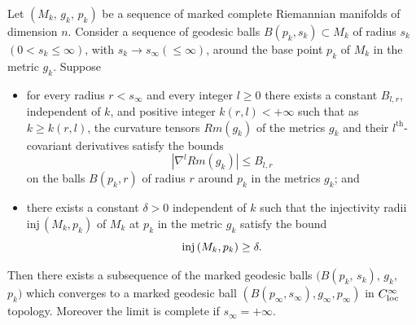 \begin{theorem}
  \label{thm:cz-cheeger-type-pointed-compactness}
Let\; $(M_k,\,g_k,\,p_k)$\; be\; a\; sequence\; of marked complete
Riemannian manifolds of dimension $n$. Consider a sequence of
geodesic balls $B(p_k,s_k) \subset M_k$ of radius $s_k$ $(0<s_k\le
\infty)$, with $s_k \rightarrow s_{\infty}(\le \infty)$, around
the base point $p_k$ of $M_k$ in the metric $g_k$. Suppose
\begin{itemize}
\item[(a)] for every radius $r<s_{\infty}$ and every integer $l\ge
0$ there exists a constant $B_{l,r}$, independent of $k$, and
positive integer $k(r,l) < +\infty$ such that as $k \geq k(r,l)$,
the curvature tensors $Rm(g_k)$ of the metrics $g_k$ and their
$l^{\mbox{th}}$-covariant derivatives satisfy the bounds
$$
|\nabla^lRm(g_k)|\leq B_{l,r}
$$
on the balls $B(p_k, r)$ of radius $r$ around $p_k$ in the metrics
$g_k$; and \item[(b)] there exists a constant $\delta>0$
independent of $k$ such that the injectivity radii
inj$\,(M_k,p_k)$ of $M_k$ at $p_k$ in the metric $g_k$ satisfy the
bound
$$
{\rm inj}\,(M_k,p_k)\geq\delta.$$
\end{itemize}
Then there exists a subsequence of the marked geodesic balls
$(B(p_k,\,s_k),\,g_k,$ $p_k)$ which converges to a marked geodesic
ball $(B(p_{\infty},s_{\infty}),g_{\infty},p_{\infty})$ in
$C^\infty_{\rm loc}$ topology. Moreover the limit is complete if
$s_{\infty} = +\infty$.

\end{theorem}

